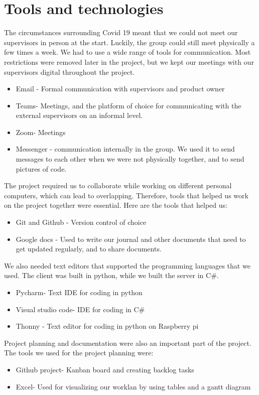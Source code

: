 \section{Tools and technologies}
The circumstances surrounding Covid 19 meant that we could not meet our supervisors in person at the start. Luckily, the group could still meet physically a few times a week. We had to use a wide range of tools for communication. Most restrictions were removed later in the project, but we kept our meetings with our supervisors digital throughout the project. 

\begin{itemize}
	\item Email - Formal communication with supervisors and product owner
	\item Teams- Meetings, and the platform of choice for communicating with the external supervisors on an informal level. 
	\item Zoom- Meetings
	\item Messenger - communication internally in the group. We used it to send messages to each other when we were not physically together, and to send pictures of code. 
\end{itemize}

The project required us to collaborate while working on different personal computers, which can lead to overlapping. Therefore, tools that helped us work on the project together were essential. Here are the tools that helped us:

\begin{itemize}
	\item Git and Github - Version control of choice
	\item Google docs - Used to write our journal and other documents that need to get updated regularly, and to share documents. 
\end{itemize}

We also needed text editors that supported the programming languages that we used. The client was built in python, while we built the server in C#. 

\begin{itemize}
	\item Pycharm- Text IDE for coding in python
	\item Visual studio code- IDE for coding in C\#
	\item Thonny - Text editor for coding in python on Raspberry pi
\end{itemize}

Project planning and documentation were also an important part of the project. The tools we used for the project planning were:

\begin{itemize}
	\item Github project- Kanban board and creating backlog tasks
	\item Excel- Used for visualizing our worklan by using tables and a gantt diagram
\end{itemize}